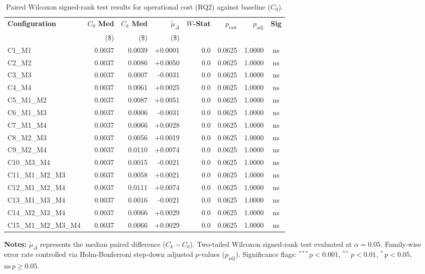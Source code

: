 \begin{table}[!htbp]
\centering
\small
\caption{Paired Wilcoxon signed-rank test results for operational cost (RQ2) against baseline ($C_0$).}
\label{tab:wilcoxon_rq2}
\begin{tabular*}{\textwidth}{@{\extracolsep{\fill}} l r r r r r r c @{}}
\toprule
\textbf{Configuration} & \textbf{$C_0$ Med} & \textbf{$C_k$ Med} & \textbf{$\tilde{\mu}_\Delta$} & \textbf{$W$-Stat} & \textbf{$p_{\text{raw}}$} & \textbf{$p_{\text{adj}}$} & \textbf{Sig} \\
 & \scriptsize{(\$)} & \scriptsize{(\$)} & \scriptsize{(\$)} & & & & \\
\midrule
C1\_M1 & 0.0037 & 0.0039 & +0.0001 & 0.0 & 0.0625 & 1.0000 & ns \\
C2\_M2 & 0.0037 & 0.0086 & +0.0050 & 0.0 & 0.0625 & 1.0000 & ns \\
C3\_M3 & 0.0037 & 0.0007 & -0.0031 & 0.0 & 0.0625 & 1.0000 & ns \\
C4\_M4 & 0.0037 & 0.0061 & +0.0025 & 0.0 & 0.0625 & 1.0000 & ns \\
C5\_M1\_M2 & 0.0037 & 0.0087 & +0.0051 & 0.0 & 0.0625 & 1.0000 & ns \\
C6\_M1\_M3 & 0.0037 & 0.0006 & -0.0031 & 0.0 & 0.0625 & 1.0000 & ns \\
C7\_M1\_M4 & 0.0037 & 0.0066 & +0.0028 & 0.0 & 0.0625 & 1.0000 & ns \\
C8\_M2\_M3 & 0.0037 & 0.0056 & +0.0019 & 0.0 & 0.0625 & 1.0000 & ns \\
C9\_M2\_M4 & 0.0037 & 0.0110 & +0.0074 & 0.0 & 0.0625 & 1.0000 & ns \\
C10\_M3\_M4 & 0.0037 & 0.0015 & -0.0021 & 0.0 & 0.0625 & 1.0000 & ns \\
C11\_M1\_M2\_M3 & 0.0037 & 0.0058 & +0.0021 & 0.0 & 0.0625 & 1.0000 & ns \\
C12\_M1\_M2\_M4 & 0.0037 & 0.0111 & +0.0074 & 0.0 & 0.0625 & 1.0000 & ns \\
C13\_M1\_M3\_M4 & 0.0037 & 0.0016 & -0.0021 & 0.0 & 0.0625 & 1.0000 & ns \\
C14\_M2\_M3\_M4 & 0.0037 & 0.0066 & +0.0029 & 0.0 & 0.0625 & 1.0000 & ns \\
C15\_M1\_M2\_M3\_M4 & 0.0037 & 0.0066 & +0.0029 & 0.0 & 0.0625 & 1.0000 & ns \\
\bottomrule
\end{tabular*}
\vspace{0.5em}
\parbox{\textwidth}{\footnotesize
\textbf{Notes:} $\tilde{\mu}_\Delta$ represents the median paired difference ($C_k - C_0$). Two-tailed Wilcoxon signed-rank test evaluated at $\alpha = 0.05$. Family-wise error rate controlled via Holm-Bonferroni step-down adjusted $p$-values ($p_{\text{adj}}$). Significance flags: $^{***}\,p < 0.001$, $^{**}\,p < 0.01$, $^{*}\,p < 0.05$, $\text{ns}\,p \ge 0.05$.}
\end{table}
